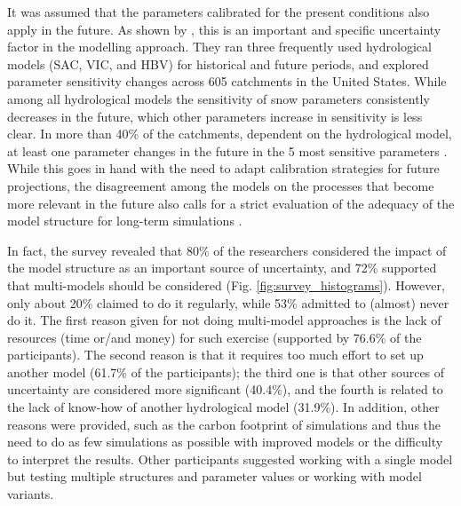 \documentclass[10pt,a4paper]{article}
\begin{document}
It was assumed that the parameters calibrated for the present conditions also apply in the future. As shown by \citep{Melsen2021}, this is an important and specific uncertainty factor in the modelling approach. They ran three frequently used hydrological models (SAC, VIC, and HBV) for historical and future periods, and explored parameter sensitivity changes across 605 catchments in the United States. While among all hydrological models the sensitivity of snow parameters consistently decreases in the future, which other parameters increase in sensitivity is less clear. In more than 40\% of the catchments, dependent on the hydrological model, at least one parameter changes in the future in the 5 most sensitive parameters \citep{Melsen2021}. While this goes in hand with the need to adapt calibration strategies for future projections, the disagreement among the models on the processes that become more relevant in the future also calls for a strict evaluation of the adequacy of the model structure for long-term simulations \citep{Melsen2021}.

In fact, the survey revealed that 80\% of the researchers considered the impact of the model structure as an important source of uncertainty, and 72\% supported that multi-models should be considered (Fig. \ref{fig:survey_histograms}). However, only about 20\% claimed to do it regularly, while 53\% admitted to (almost) never do it. The first reason given for not doing multi-model approaches is the lack of resources (time or/and money) for such exercise (supported by 76.6\% of the participants). The second reason is that it requires too much effort to set up another model (61.7\% of the participants); the third one is that other sources of uncertainty are considered more significant (40.4\%), and the fourth is related to the lack of know-how of another hydrological model (31.9\%). In addition, other reasons were provided, such as the carbon footprint of simulations and thus the need to do as few simulations as possible with improved models or the difficulty to interpret the results. Other participants suggested working with a single model but testing multiple structures and parameter values or working with model variants.
\end{document}
